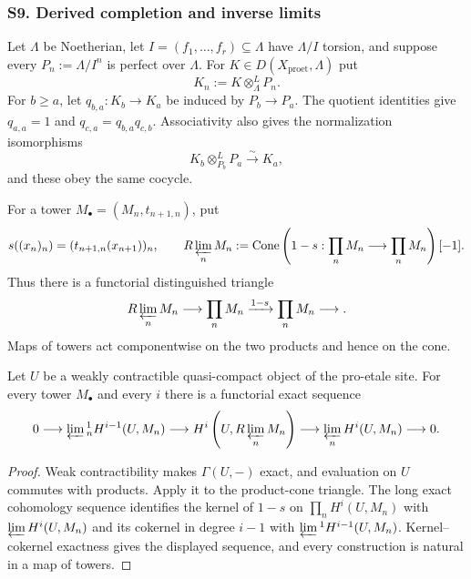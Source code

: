 \subsubsection{S9. Derived completion and inverse limits}

\begin{definition}
\label{def:weil-pbc-complete-coefficient-datum}
\uses{}
Let $\Lambda$ be Noetherian, let $I=(f_1,\ldots,f_r)\subseteq\Lambda$ have
$\Lambda/I$ torsion, and suppose every $P_n:=\Lambda/I^n$ is perfect over
$\Lambda$.  For $K\in D(X_{\mathrm{proet}},\Lambda)$ put
\[
 K_n:=K\otimes^L_\Lambda P_n.
\]
For $b\geq a$, let $q_{b,a}:K_b\to K_a$ be induced by
$P_b\to P_a$.  The quotient identities give
$q_{a,a}=1$ and $q_{c,a}=q_{b,a}q_{c,b}$.  Associativity also gives the
normalization isomorphisms
\[
 K_b\otimes^L_{P_b}P_a\xrightarrow{\sim}K_a,
\]
and these obey the same cocycle.
\end{definition}

\begin{definition}
\label{def:weil-pbc-adic-derived-inverse-limit}
For a tower $M_\bullet=(M_n,t_{n+1,n})$, put
\[
 s((x_n)_n)=(t_{n+1,n}(x_{n+1}))_n,
 \qquad
 R\varprojlim_nM_n:=\operatorname{Cone}
 \left(1-s:\prod_nM_n\longrightarrow\prod_nM_n\right)[-1].
\]
Thus there is a functorial distinguished triangle
\[
 R\varprojlim_nM_n\longrightarrow\prod_nM_n
 \xrightarrow{1-s}\prod_nM_n\longrightarrow .
\]
Maps of towers act componentwise on the two products and hence on the cone.
\end{definition}

\begin{lemma}
\label{lemma:weil-pbc-adic-milnor-sequence}
Let $U$ be a weakly contractible quasi-compact object of the pro-etale site.
For every tower $M_\bullet$ and every $i$ there is a functorial exact
sequence
\[
 0\longrightarrow\varprojlim
 {}^{1}_nH^{i-1}(U,M_n)\longrightarrow
 H^i\left(U,R\varprojlim_nM_n\right)\longrightarrow
 \varprojlim_nH^i(U,M_n)\longrightarrow0.
\]
\end{lemma}
\begin{proof}
Weak contractibility makes $\Gamma(U,-)$ exact, and evaluation on $U$
commutes with products.  Apply it to the product-cone triangle.  The long
exact cohomology sequence identifies the kernel of $1-s$ on
$\prod_nH^i(U,M_n)$ with $\varprojlim H^i(U,M_n)$ and its cokernel in
degree $i-1$ with $\varprojlim{}^1H^{i-1}(U,M_n)$.  Kernel--cokernel
exactness gives the displayed sequence, and every construction is natural
in a map of towers.
\end{proof}

